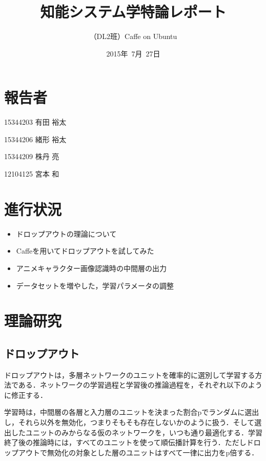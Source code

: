 \documentclass[a4paper,10pt]{jsarticle}
\title{知能システム学特論レポート}
\author{
（DL2班）Caffe on Ubuntu\\
}
\date{2015年\ 7月\ 27日}
\begin{document}
\maketitle
\section{報告者}
\begin{list}{}{}
 \item 15344203\hspace{0.5cm} 有田 裕太
 \item 15344206\hspace{0.5cm} 緒形 裕太
 \item 15344209\hspace{0.5cm} 株丹 亮
 \item 12104125\hspace{0.5cm} 宮本 和
\end{list}

\section{進行状況}

\begin{itemize}
\item ドロップアウトの理論について
\item Caffeを用いてドロップアウトを試してみた
\item アニメキャラクター画像認識時の中間層の出力
\item データセットを増やした，学習パラメータの調整
\end{itemize}

\section{理論研究}
\subsection{ドロップアウト}
ドロップアウトは，多層ネットワークのユニットを確率的に選別して学習する方法である．ネットワークの学習過程と学習後の推論過程を，それぞれ以下のように修正する．

学習時は，中間層の各層と入力層のユニットを決まった割合pでランダムに選出し，それら以外を無効化，つまりそもそも存在しないかのように扱う．そして選出したユニットのみからなる仮のネットワークを，いつも通り最適化する．学習終了後の推論時には，すべてのユニットを使って順伝播計算を行う．ただしドロップアウトで無効化の対象とした層のユニットはすべて一律に出力をp倍する．
\end{document}
